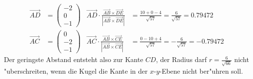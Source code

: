 \begin{loesung}
\begin{align*}
\overrightarrow{AD}
&=
\begin{pmatrix}-2\\0\\-1\end{pmatrix}
&
\overrightarrow{AD}
\cdot
\frac{ \overrightarrow{AB}\times\overrightarrow{DE}}{|\overrightarrow{AB}\times\overrightarrow{DE}|}
&=
\frac{10+0-4}{\sqrt{57}}=\frac{6}{\sqrt{57}}=0.79472
\\
\overrightarrow{AC}
&=
\begin{pmatrix}0\\-2\\-1\end{pmatrix}
&
\overrightarrow{AC}
\cdot
\frac{ \overrightarrow{AB}\times\overrightarrow{CE}}{|\overrightarrow{AB}\times\overrightarrow{CE}|}
&=
\frac{0-10+4}{\sqrt{57}}=-\frac{6}{\sqrt{57}}=-0.79472
\end{align*}
Der geringste Abstand entsteht also zur Kante $CD$, der Radius darf
$r=\frac6{\sqrt{66}}$ nicht "uberschreiten, wenn die Kugel die Kante
in der $x$-$y$-Ebene nicht ber"uhren soll.
\end{loesung}

